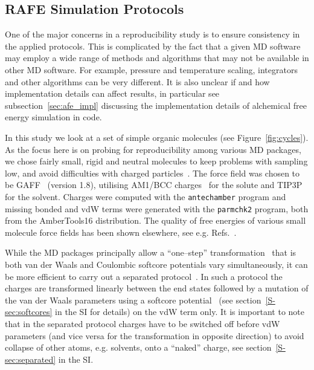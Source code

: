 \documentclass[journal=jctcce,manuscript=article]{achemso}
\newcommand{\progname}[1]{\texttt{#1}}
\begin{document}
\subsection{RAFE Simulation Protocols}
\label{sec:rafe_protocols}

One of the major concerns in a reproducibility study is to ensure
consistency in the applied protocols.  This is complicated by the fact
that a given MD software may employ a wide range of methods and algorithms that
may not be available in other MD software.  For example, pressure and
temperature scaling, integrators and other algorithms can be very
different.  It is also unclear if and how implementation details can
affect results, in particular see subsection~\ref{sec:afe_impl} discussing the 
implementation details of alchemical free energy simulation in code.

In this study we look at a set of simple organic molecules (see
Figure~\ref{fig:cycles}).  As the focus here is on probing for
reproducibility among various MD packages, we chose fairly small,
rigid and neutral molecules to keep problems with sampling low, and
avoid difficulties with charged
particles~\cite{rocklin_calculating_2013, JCC:JCC1050}.  The force
field was chosen to be GAFF~\cite{wang_development_2004} (version
1.8), utilising AM1/BCC charges~\cite{jakalian_fast_2000,
  jakalian_fast_2002} for the solute and
TIP3P~\cite{jorgensen_comparison_1983-1} for the solvent.  Charges were 
computed with the \progname{antechamber} program and missing bonded and vdW 
terms were generated with the \progname{parmchk2} program, both from the 
AmberTools16 distribution.  The quality of free energies of various small 
molecule force fields has been shown
elsewhere, see e.g. Refs.~.

While the MD packages principally allow a ``one--step'' 
transformation~\cite{steinbrecher_soft-core_2011}
that is both van der Waals and Coulombic softcore potentials vary
simultaneously, it can be more efficient to carry out a
separated protocol~\cite{naden_linear_2014, naden_linear_2015}. 
In such a protocol the charges are transformed
linearly between the end states followed by a mutation of the van der
Waals parameters using a softcore
potential~\cite{beutler_avoiding_1994,
  zacharias_separationshifted_1994} (see section~\ref{S-sec:softcores} in the SI for details) on the vdW
term only.  It is important to note that in the separated protocol
charges have to be switched off before vdW parameters (and vice versa
for the transformation in opposite direction) to avoid collapse of
other atoms, e.g. solvents, onto a ``naked'' charge, see 
section~\ref{S-sec:separated} in the SI.
\end{document}
